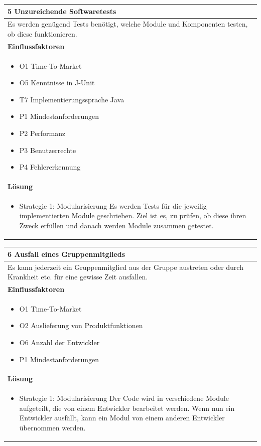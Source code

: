 \documentclass[fontsize=12pt,paper=a4,twoside]{scrartcl}
\begin{document}
\begin{table}[H]
\begin{tabular}{|p{\textwidth}|}\hline
5 Unzureichende Softwaretests\\ \hline
Es werden genügend Tests benötigt, welche Module und Komponenten testen, ob diese funktionieren.\\ \hline
\textbf{Einflussfaktoren}\\
\begin{itemize}
\item O1 Time-To-Market
\item O5 Kenntnisse in J-Unit
\item T7 Implementierungssprache Java
\item P1 Mindestanforderungen
\item P2 Performanz
\item P3 Benutzerrechte
\item P4 Fehlererkennung
\end{itemize}\\ \hline
\textbf{Lösung}\\
\begin{itemize}
\item Strategie 1: Modularisierung \leavevmode\newline
Es werden Tests für die jeweilig implementierten Module geschrieben. Ziel ist es, zu prüfen, ob diese ihren Zweck erfüllen und danach werden Module zusammen getestet. 
\end{itemize} \\ \hline
\end{tabular}
\end{table}

\begin{table}[H]
\begin{tabular}{|p{\textwidth}|}\hline
6 Ausfall eines Gruppenmitglieds\\ \hline
Es kann jederzeit ein Gruppenmitglied aus der Gruppe austreten oder durch Krankheit etc. für eine gewisse Zeit ausfallen.\\ \hline
\textbf{Einflussfaktoren}\\
\begin{itemize}
\item O1 Time-To-Market
\item O2 Auslieferung von Produktfunktionen
\item O6 Anzahl der Entwickler
\item P1 Mindestanforderungen
\end{itemize}\\ \hline
\textbf{Lösung}\\
\begin{itemize}
\item Strategie 1: Modularisierung \leavevmode\newline
Der Code wird in verschiedene Module aufgeteilt, die von einem Entwickler bearbeitet werden. Wenn nun ein Entwickler ausfällt, kann ein Modul von einem anderen Entwickler übernommen werden.
\end{itemize} \\ \hline
\end{tabular}
\end{table}
\end{document}
